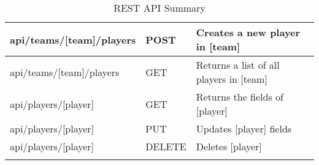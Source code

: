 \begin{longtable}{|p{}|p{} |p{}|}
api/teams/[team]/players & POST & Creates a new player in [team]\\ \hline
api/teams/[team]/players & GET &  Returns a list of all players in [team]\\ \hline
api/players/[player] & GET &  Returns the fields of [player]\\ \hline
api/players/[player] & PUT &  Updates [player] fields\\ \hline
api/players/[player] & DELETE &  Deletes [player]\\ \hline
\caption{REST API Summary}
\label{tab:termGlossary}
\end{longtable}